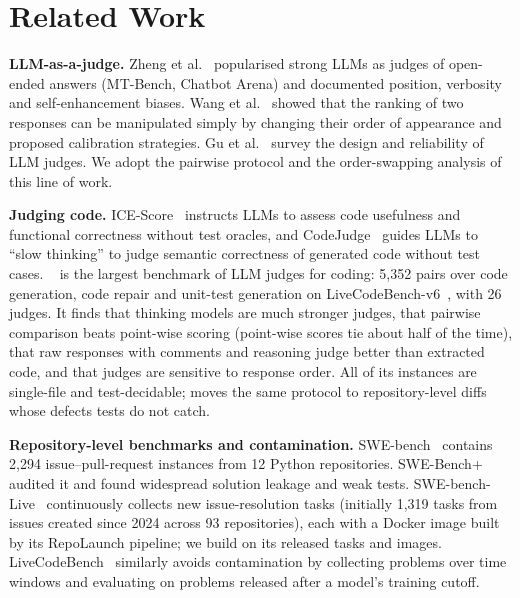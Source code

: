 \section{Related Work}
\label{sec:related}

\textbf{LLM-as-a-judge.}  Zheng et al.~\cite{zheng2023judging} popularised
strong LLMs as judges of open-ended answers (MT-Bench, Chatbot Arena) and
documented position, verbosity and self-enhancement biases.  Wang et
al.~\cite{wang2023fair} showed that the ranking of two responses can be
manipulated simply by changing their order of appearance and proposed
calibration strategies.  Gu et al.~\cite{gu2024survey} survey the design and
reliability of LLM judges.  We adopt the pairwise protocol and the
order-swapping analysis of this line of work.

\textbf{Judging code.}  ICE-Score~\cite{zhuo2024icescore} instructs LLMs to
assess code usefulness and functional correctness without test oracles, and
CodeJudge~\cite{tong2024codejudge} guides LLMs to ``slow thinking'' to judge
semantic correctness of generated code without test cases.
\CJB{}~\cite{jiang2025codejudgebench} is the largest benchmark of LLM judges for
coding: 5{,}352 pairs over code generation, code repair and unit-test generation
on LiveCodeBench-v6~\cite{jain2024livecodebench}, with 26 judges.  It finds that
thinking models are much stronger judges, that pairwise comparison beats
point-wise scoring (point-wise scores tie about half of the time), that raw
responses with comments and reasoning judge better than extracted code, and that
judges are sensitive to response order.  All of its instances are single-file
and test-decidable; \RJB{} moves the same protocol to repository-level diffs
whose defects tests do not catch.

\textbf{Repository-level benchmarks and contamination.}
SWE-bench~\cite{jimenez2024swebench} contains 2{,}294 issue--pull-request
instances from 12 Python repositories.  SWE-Bench+~\cite{aleithan2024swebenchplus}
audited it and found widespread solution leakage and weak tests.
SWE-bench-Live~\cite{zhang2025swebenchlive} continuously collects new
issue-resolution tasks (initially 1{,}319 tasks from issues created since 2024
across 93 repositories), each with a Docker image built by its RepoLaunch
pipeline; we build on its released tasks and images.  LiveCodeBench~\cite{jain2024livecodebench} similarly avoids contamination by
collecting problems over time windows and evaluating on problems released after
a model's training cutoff.

